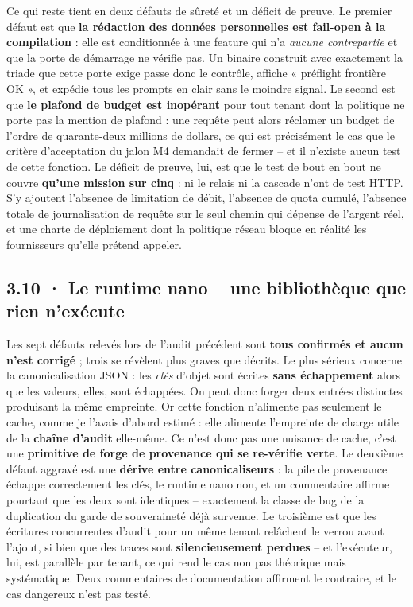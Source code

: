 \documentclass[10pt]{article}
\begin{document}
Ce qui reste tient en deux défauts de sûreté et un déficit de preuve. Le premier défaut est que
\textbf{la rédaction des données personnelles est fail-open à la compilation} : elle est conditionnée à
une feature qui n'a \emph{aucune contrepartie} et que la porte de démarrage ne vérifie pas. Un binaire
construit avec exactement la triade que cette porte exige passe donc le contrôle, affiche « préflight
frontière OK », et expédie tous les prompts en clair sans le moindre signal. Le second est que
\textbf{le plafond de budget est inopérant} pour tout tenant dont la politique ne porte pas la mention
de plafond : une requête peut alors réclamer un budget de l'ordre de quarante-deux millions de dollars,
ce qui est précisément le cas que le critère d'acceptation du jalon M4 demandait de fermer -- et il
n'existe aucun test de cette fonction. Le déficit de preuve, lui, est que le test de bout en bout ne
couvre \textbf{qu'une mission sur cinq} : ni le relais ni la cascade n'ont de test HTTP. S'y ajoutent
l'absence de limitation de débit, l'absence de quota cumulé, l'absence totale de journalisation de
requête sur le seul chemin qui dépense de l'argent réel, et une charte de déploiement dont la politique
réseau bloque en réalité les fournisseurs qu'elle prétend appeler.

\subsection{3.10 · Le runtime nano -- une bibliothèque que rien n'exécute}

Les sept défauts relevés lors de l'audit précédent sont \textbf{tous confirmés et aucun n'est corrigé} ;
trois se révèlent plus graves que décrits. Le plus sérieux concerne la canonicalisation JSON : les
\emph{clés} d'objet sont écrites \textbf{sans échappement} alors que les valeurs, elles, sont échappées.
On peut donc forger deux entrées distinctes produisant la même empreinte. Or cette fonction n'alimente
pas seulement le cache, comme je l'avais d'abord estimé : elle alimente l'empreinte de charge utile de
la \textbf{chaîne d'audit} elle-même. Ce n'est donc pas une nuisance de cache, c'est une
\textbf{primitive de forge de provenance qui se re-vérifie verte}. Le deuxième défaut aggravé est une
\textbf{dérive entre canonicaliseurs} : la pile de provenance échappe correctement les clés, le runtime
nano non, et un commentaire affirme pourtant que les deux sont identiques -- exactement la classe de bug
de la duplication du garde de souveraineté déjà survenue. Le troisième est que les écritures
concurrentes d'audit pour un même tenant relâchent le verrou avant l'ajout, si bien que des traces sont
\textbf{silencieusement perdues} -- et l'exécuteur, lui, est parallèle par tenant, ce qui rend le cas
non pas théorique mais systématique. Deux commentaires de documentation affirment le contraire, et le
cas dangereux n'est pas testé.
\end{document}
